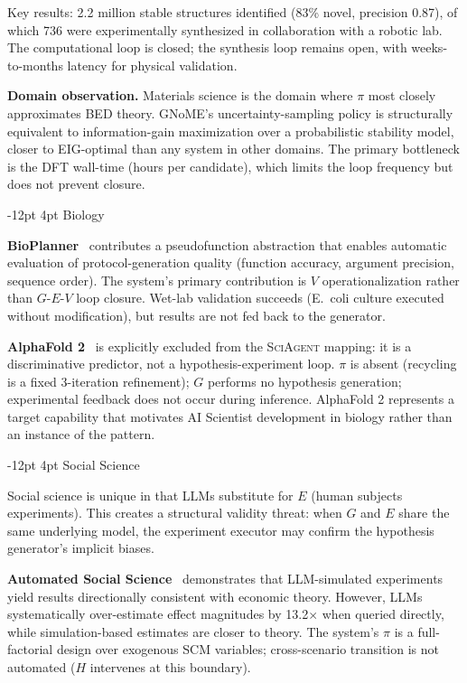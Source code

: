 \documentclass[11pt]{article}
\makeatletter
\renewcommand\subsection{\@startsection{subsection}{2}{\z@}%
  {-12pt \@plus -2pt \@minus -2pt}%
  {4pt \@plus 1pt}%
  {\normalfont\normalsize\bfseries}}
\newcommand{\framework}{\textsc{SciAgent}}
\makeatother
\begin{document}
\noindent Key results: 2.2 million stable structures identified (83\% novel, precision 0.87), of which 736 were experimentally synthesized in collaboration with a robotic lab. The computational loop is closed; the synthesis loop remains open, with weeks-to-months latency for physical validation.

\textbf{Domain observation.} Materials science is the domain where $\pi$ most closely approximates BED theory. GNoME's uncertainty-sampling policy is structurally equivalent to information-gain maximization over a probabilistic stability model, closer to EIG-optimal than any system in other domains. The primary bottleneck is the DFT wall-time (hours per candidate), which limits the loop frequency but does not prevent closure.

\subsection{Biology}

\textbf{BioPlanner}~\citep{odonoghue2023bioplanner} contributes a pseudofunction abstraction that enables automatic evaluation of protocol-generation quality (function accuracy, argument precision, sequence order). The system's primary contribution is $V$ operationalization rather than $G$-$E$-$V$ loop closure. Wet-lab validation succeeds (E.\ coli culture executed without modification), but results are not fed back to the generator.

\textbf{AlphaFold 2}~\citep{jumper2021alphafold} is explicitly excluded from the \framework{} mapping: it is a discriminative predictor, not a hypothesis-experiment loop. $\pi$ is absent (recycling is a fixed 3-iteration refinement); $G$ performs no hypothesis generation; experimental feedback does not occur during inference. AlphaFold 2 represents a target capability that motivates AI Scientist development in biology rather than an instance of the pattern.

\subsection{Social Science}

Social science is unique in that LLMs substitute for $E$ (human subjects experiments). This creates a structural validity threat: when $G$ and $E$ share the same underlying model, the experiment executor may confirm the hypothesis generator's implicit biases.

\textbf{Automated Social Science}~\citep{manning2024automated} demonstrates that LLM-simulated experiments yield results directionally consistent with economic theory. However, LLMs systematically over-estimate effect magnitudes by 13.2$\times$ when queried directly, while simulation-based estimates are closer to theory. The system's $\pi$ is a full-factorial design over exogenous SCM variables; cross-scenario transition is not automated ($H$ intervenes at this boundary).
\end{document}
